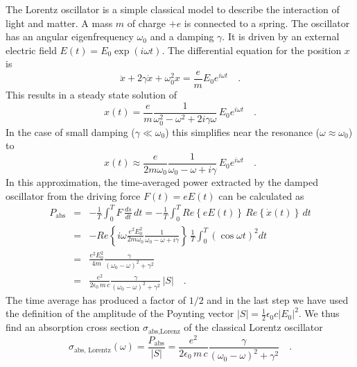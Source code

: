 The Lorentz oscillator is a simple classical model to describe the interaction of light and matter. A mass $m$ of charge $+e$ is connected to a spring. The oscillator has an angular eigenfrequency $\omega_0$ and a damping $\gamma$. It is driven by an external electric field $E(t) = E_0 \exp(i \omega t)$. The differential equation for the position $x$ is
\begin{equation}
  \ddot{x} + 2 \gamma \dot{x} + \omega_0^2 x = \frac{e}{m} E_0 e^{i \omega t} \quad . \label{eq:1_dgl_osci}
\end{equation}
This results in a steady state solution of
\begin{equation}
  x(t) = \frac{e}{m}  \frac{1}{\omega_0^2 - \omega^2 + 2 i \gamma \omega} \, E_0 e^{i \omega t}  \quad .
\end{equation}
In the case of small damping ($\gamma \ll \omega_0$) this simplifies near the resonance ($\omega \approx \omega_0$) to
\begin{equation}
  x(t) \approx \frac{e}{2 m \omega_0}  \frac{1}{\omega_0 - \omega + i \gamma} \, E_0 e^{i \omega t}  \quad .
\end{equation}
In this approximation, the time-averaged power extracted by the damped oscillator from the driving force $F(t) = e E(t)$ can be calculated as
%
\begin{eqnarray}
 P_{\text{abs}} &= &  - \frac{1}{T} \int_0^T F \, \frac{ds}{dt} \, dt =  
  - \frac{1}{T}  \int_0^T Re \left\{  e E(t) \right\}  \, Re \left\{ \dot{x}(t) \right\} \, dt \\
  & = & - Re \left\{i \omega  \frac{e^2  E_0^2 }{2 m \omega_0}  \frac{1}{\omega_0 - \omega +  i \gamma } \right\}  \,   \frac{1}{T}  \int_0^T \left( \cos \omega t \right)^2 dt \\
%
& = & \frac{e^2 E_0^2  }{4 m }  \frac{\gamma }{(\omega_0 - \omega)^2 +  \gamma ^2}  \\
&  = &  \frac{e^2  }{2 \epsilon_0 \, m \,c }  \frac{\gamma }{(\omega_0 - \omega)^2 +  \gamma ^2}  \, |S|  \quad .
\end{eqnarray}
%
The time average has produced a factor of $1/2$ and in the last step we have used the definition of the amplitude of the Poynting vector $|S| = \frac{1}{2} \epsilon_0 c |E_0|^2$. 
We thus find an absorption cross section $\sigma_{\text{abs,Lorenz}}$ of the classical Lorentz oscillator
\begin{equation}
 \sigma_{\text{abs, Lorentz}}(\omega) = \frac{ P_{\text{abs}} }{|S| } = \frac{e^2  }{2 \epsilon_0 \,  m \, c}  \frac{\gamma }{(\omega_0 - \omega)^2 +  \gamma ^2}  \quad .
\end{equation}

